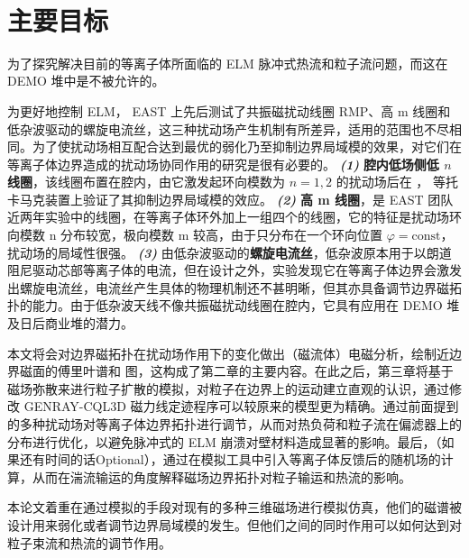 ​\section{主要目标}
为了探究解决目前的\Hmode 等离子体所面临的 ELM 脉冲式热流和粒子流问题，而这在 DEMO 堆中是不被允许的。

为更好地控制 ELM， EAST 上先后测试了共振磁扰动线圈 RMP、高 m 线圈和低杂波驱动的螺旋电流丝，这三种扰动场产生机制有所差异，适用的范围也不尽相同。为了使扰动场相互配合达到最优的弱化乃至抑制边界局域模的效果，对它们在等离子体边界造成的扰动场协同作用的研究是很有必要的。 \textit{\textbf{(1)}} \textbf{腔内低场侧低 $n$ 线圈}，该线圈布置在腔内，由它激发起环向模数为 $n=1,2$ 的扰动场后在 \east， \ddd 等托卡马克装置上验证了其抑制边界局域模的效应。 \textit{\textbf{(2)}} \textbf{高 m 线圈}，是 EAST 团队近两年实验中的线圈，在等离子体环外加上一组四个的线圈，它的特征是扰动场环向模数 n 分布较宽，极向模数 m 较高，由于只分布在一个环向位置 $\varphi=\text{const}$，扰动场的局域性很强。 \textit{\textbf{(3)}} 由低杂波驱动的\textbf{螺旋电流丝}，低杂波原本用于以朗道阻尼驱动芯部等离子体的电流，但在设计之外，实验发现它在等离子体边界会激发出螺旋电流丝，电流丝产生具体的物理机制还不甚明晰，但其亦具备调节边界磁拓扑的能力。由于低杂波天线不像共振磁扰动线圈在腔内，它具有应用在 DEMO 堆及日后商业堆的潜力。

本文将会对边界磁拓扑在扰动场作用下的变化做出（磁流体）电磁分析，绘制近边界磁面的傅里叶谱和 \Poincare 图，这构成了第二章的主要内容。在此之后，第三章将基于磁场弥散来进行粒子扩散的模拟，对粒子在边界上的运动建立直观的认识，通过修改 GENRAY-CQL3D 磁力线定迹程序可以较原来的模型更为精确。通过前面提到的多种扰动场对等离子体边界拓扑进行调节，从而对热负荷和粒子流在偏滤器上的分布进行优化，以避免脉冲式的 ELM 崩溃对壁材料造成显著的影响。最后，（如果还有时间的话Optional），通过在模拟工具中引入等离子体反馈后的随机场的计算，从而在湍流输运的角度解释磁场边界拓扑对粒子输运和热流的影响。

本论文着重在通过模拟的手段对现有的多种三维磁场进行模拟仿真，他们的磁谱被设计用来弱化或者调节边界局域模的发生。但他们之间的同时作用可以如何达到对粒子束流和热流的调节作用。